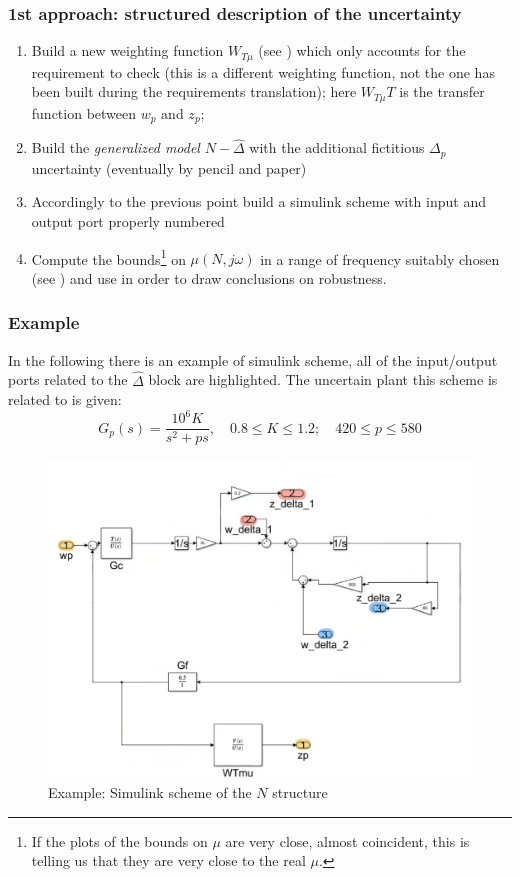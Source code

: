\documentclass[a4paper, 12pt]{article}
\begin{document}
\subsubsection{1st approach: structured description of the uncertainty}
\begin{enumerate}
    \itemsep-0.2em
    \item Build a new weighting function $W_{T\mu}$ (see ) which only accounts for the requirement to check (this is a different weighting function, not the one has been built during the requirements translation); here $W_{T\mu}T$ is the transfer function between $w_p$ and $z_p$; 
    \item Build the \textit{generalized model} $N-\hat{\Delta}$ with the additional fictitious $\Delta_p$ uncertainty (eventually by pencil and paper)
    \item Accordingly to the previous point build a simulink scheme with input and output port properly numbered
    \item Compute the bounds\footnote{
        If the plots of the bounds on $\mu$ are very close, almost coincident, this is telling us that they are very close to the real $\mu$.
    } on $\mu(N,j\omega)$ in a range of frequency suitably chosen (see ) and use  in order to draw conclusions on robustness.
\end{enumerate}

\subsubsection{Example}
\noindent
In the following there is an example of simulink scheme, all of the input/output ports related to the $\hat{\Delta}$ block are highlighted. The uncertain plant this scheme is related to is given: 
\begin{equation}
    G_p(s)=\frac{10^6{K}}{s^2+ps}, \quad 0.8\le{K}\le{1.2}; \quad
    420\le{p}\le{580}
\end{equation}
\vspace{-1cm}
\begin{figure}[h]
    \centering
    \includegraphics[scale=0.2]{img/EsNDeltaHat.jpg}
    \caption{Example: Simulink scheme of the $N$ structure}
\end{figure}
\end{document}
